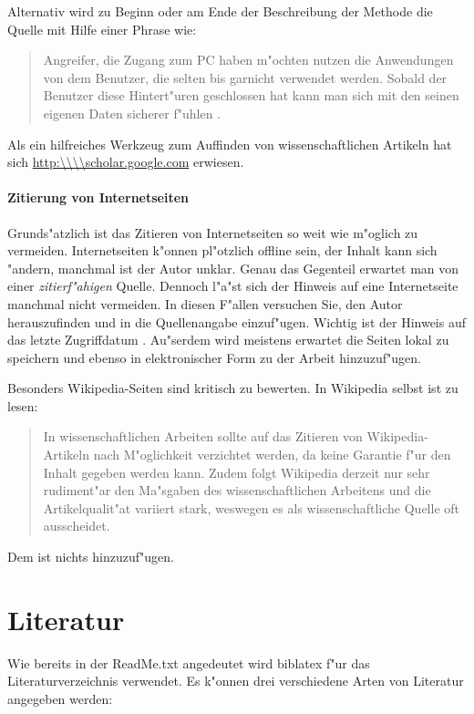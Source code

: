 Alternativ wird zu Beginn oder am Ende der Beschreibung der Methode die Quelle mit Hilfe einer Phrase wie:
\begin{quote}
Angreifer, die Zugang zum PC haben m"ochten nutzen die Anwendungen von dem Benutzer, die selten bis garnicht verwendet werden. Sobald der Benutzer diese Hintert"uren geschlossen hat kann man sich mit den seinen eigenen Daten sicherer f"uhlen \cite{ctWindowsEinfachAbsichern}.
\end{quote}


Als ein hilfreiches Werkzeug zum Auffinden von wissenschaftlichen Artikeln hat sich \url{http:\\\\scholar.google.com} erwiesen.

\paragraph{Zitierung von Internetseiten}
Grunds"atzlich ist das Zitieren von Internetseiten so weit wie m"oglich zu vermeiden.
Internetseiten k"onnen pl"otzlich offline sein, der Inhalt kann sich "andern, manchmal ist der Autor unklar.
Genau das Gegenteil erwartet man von einer \emph{zitierf"ahigen} Quelle.
Dennoch l"a"st sich der Hinweis auf eine Internetseite manchmal nicht vermeiden.
In diesen F"allen versuchen Sie, den Autor herauszufinden und in die Quellenangabe einzuf"ugen.
Wichtig ist der Hinweis auf das letzte Zugriffdatum \cite{zitieren13}.
Au"serdem wird meistens erwartet die Seiten lokal zu speichern und ebenso in elektronischer Form zu der Arbeit hinzuzuf"ugen.

Besonders Wikipedia-Seiten sind kritisch zu bewerten. In Wikipedia selbst ist zu lesen:
\begin{quote}
\glqq In wissenschaftlichen Arbeiten sollte auf das Zitieren von Wikipedia-Artikeln nach M"oglichkeit verzichtet werden, da keine Garantie f"ur den Inhalt gegeben werden kann.
Zudem folgt Wikipedia derzeit nur sehr rudiment"ar den Ma"sgaben des wissenschaftlichen Arbeitens und die Artikelqualit"at variiert stark, weswegen es als wissenschaftliche Quelle oft ausscheidet.\grqq \cite{zitieren13a}
\end{quote}
Dem ist nichts hinzuzuf"ugen.

\section{Literatur}
\label{sec:Literatur}

Wie bereits in der ReadMe.txt angedeutet wird biblatex f"ur das Literaturverzeichnis verwendet. Es k"onnen drei verschiedene Arten von Literatur angegeben werden:

